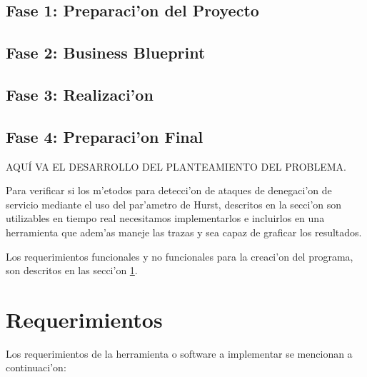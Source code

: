 \subsection{Fase 1: Preparaci'on del Proyecto}
\subsection{Fase 2: Business Blueprint}
\subsection{Fase 3: Realizaci'on}
\subsection{Fase 4: Preparaci'on Final}

AQU\'I VA EL DESARROLLO DEL PLANTEAMIENTO DEL PROBLEMA.
\vspace{5 mm}

Para verificar si los m'etodos para detecci'on de ataques de denegaci'on de
servicio mediante el uso del par'ametro de Hurst, descritos en la secci'on
son utilizables en tiempo real necesitamos implementarlos e incluirlos en 
una herramienta que adem'as maneje las trazas y sea capaz de graficar los resultados. 

Los requerimientos funcionales y no funcionales para la creaci'on del programa,
son descritos en las secci'on \ref{sect:requirements}. 

\section{Requerimientos} \label{sect:requirements}

Los requerimientos de la herramienta o software a implementar se mencionan a
continuaci'on: 

